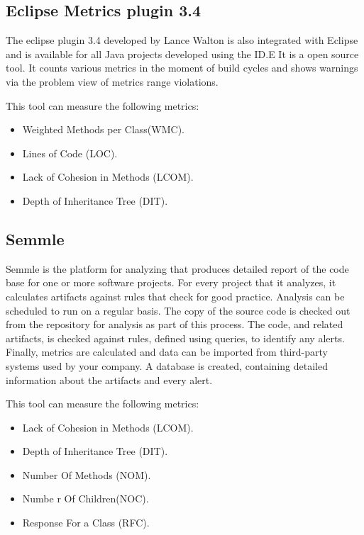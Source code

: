 \subsection{Eclipse Metrics plugin 3.4}
The  eclipse  plugin  3.4 developed  by  Lance  Walton  is  also  integrated  with Eclipse   and   is   available   for   all   Java   projects 
developed using the ID.E It is a open source tool. It counts various metrics in the moment of build cycles and shows warnings via the problem view of metrics range violations.

This tool can measure the following metrics:
\begin{itemize}
	\item Weighted Methods per Class(WMC).
	\item Lines of Code (LOC). 
	\item Lack of Cohesion in Methods (LCOM).
	\item Depth of Inheritance Tree (DIT).
\end{itemize}

\subsection{Semmle}

Semmle is the platform for analyzing that produces detailed report of the code base for one or more software projects. For every project that it analyzes, it calculates artifacts against rules that check for good practice. Analysis can be scheduled to run on a regular basis. The copy of the source code is checked out from the repository for analysis as part of this process. The code, and related artifacts, is checked against rules, defined using queries, to identify any alerts. Finally, metrics are calculated and data can be imported from third-party systems used by your company. A database is created, containing detailed information about the artifacts and every alert.

This tool can measure the following metrics:
\begin{itemize}
	\item Lack of Cohesion in Methods (LCOM).
	\item Depth of Inheritance Tree (DIT).
	\item Number Of Methods (NOM).
	\item Numbe r Of Children(NOC).
	\item Response For a Class (RFC).
\end{itemize}

